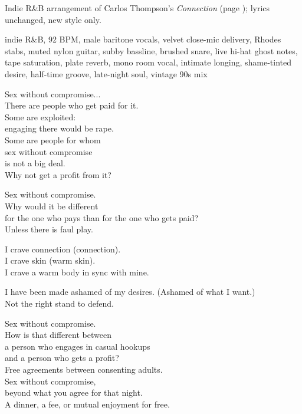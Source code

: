 
\begin{notes}
Indie R\&B arrangement of Carlos Thompson's \emph{Connection} (page \pageref{sec:connection}); lyrics unchanged, new style only.
\end{notes}
\begin{style}
indie R\&B, 92 BPM, male baritone vocals, velvet close-mic delivery, Rhodes stabs, muted nylon guitar, subby bassline, brushed snare, live hi-hat ghost notes, tape saturation, plate reverb, mono room vocal, intimate longing, shame-tinted desire, half-time groove, late-night soul, vintage 90s mix
\end{style}
\begin{lyrics}
Sex without compromise...\\
There are people who get paid for it.\\
Some are exploited:\\
engaging there would be rape.\\
Some are people for whom\\
sex without compromise\\
is not a big deal.\\
Why not get a profit from it?

Sex without compromise.\\
Why would it be different\\
for the one who pays than for the one who gets paid?\\
Unless there is faul play.

I crave connection (connection).\\
I crave skin (warm skin).\\
I crave a warm body in sync with mine.

I have been made ashamed of my desires.
(Ashamed of what I want.)\\
Not the right stand to defend.

Sex without compromise.\\
How is that different between\\
a person who engages in casual hookups\\
and a person who gets a profit?\\
Free agreements between consenting adults.\\
Sex without compromise,\\
beyond what you agree for that night.\\
A dinner, a fee, or mutual enjoyment for free.


\end{lyrics}
